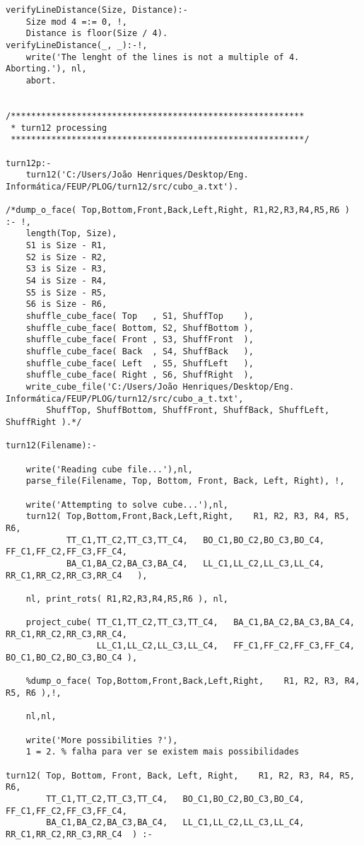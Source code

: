 \begin{lstlisting}
verifyLineDistance(Size, Distance):-
	Size mod 4 =:= 0, !,
	Distance is floor(Size / 4).
verifyLineDistance(_, _):-!,
	write('The lenght of the lines is not a multiple of 4. Aborting.'), nl,
	abort.

	
/**********************************************************
 * turn12 processing
 **********************************************************/
 
turn12p:-
	turn12('C:/Users/João Henriques/Desktop/Eng. Informática/FEUP/PLOG/turn12/src/cubo_a.txt').
 
/*dump_o_face( Top,Bottom,Front,Back,Left,Right, R1,R2,R3,R4,R5,R6 ) :- !,
	length(Top, Size),
	S1 is Size - R1,
	S2 is Size - R2,
	S3 is Size - R3,
	S4 is Size - R4,
	S5 is Size - R5,
	S6 is Size - R6,
	shuffle_cube_face( Top   , S1, ShuffTop    ),
	shuffle_cube_face( Bottom, S2, ShuffBottom ),
	shuffle_cube_face( Front , S3, ShuffFront  ),
	shuffle_cube_face( Back  , S4, ShuffBack   ),
	shuffle_cube_face( Left  , S5, ShuffLeft   ),
	shuffle_cube_face( Right , S6, ShuffRight  ),
	write_cube_file('C:/Users/João Henriques/Desktop/Eng. Informática/FEUP/PLOG/turn12/src/cubo_a_t.txt',
		ShuffTop, ShuffBottom, ShuffFront, ShuffBack, ShuffLeft, ShuffRight ).*/

turn12(Filename):-

	write('Reading cube file...'),nl,
	parse_file(Filename, Top, Bottom, Front, Back, Left, Right), !,
	
	write('Attempting to solve cube...'),nl,
	turn12( Top,Bottom,Front,Back,Left,Right,    R1, R2, R3, R4, R5, R6,
			TT_C1,TT_C2,TT_C3,TT_C4,   BO_C1,BO_C2,BO_C3,BO_C4,    FF_C1,FF_C2,FF_C3,FF_C4,
			BA_C1,BA_C2,BA_C3,BA_C4,   LL_C1,LL_C2,LL_C3,LL_C4,    RR_C1,RR_C2,RR_C3,RR_C4   ),

	nl,	print_rots( R1,R2,R3,R4,R5,R6 ), nl,
	
	project_cube( TT_C1,TT_C2,TT_C3,TT_C4,   BA_C1,BA_C2,BA_C3,BA_C4,   RR_C1,RR_C2,RR_C3,RR_C4,
                  LL_C1,LL_C2,LL_C3,LL_C4,   FF_C1,FF_C2,FF_C3,FF_C4,   BO_C1,BO_C2,BO_C3,BO_C4 ),
				  
	%dump_o_face( Top,Bottom,Front,Back,Left,Right,    R1, R2, R3, R4, R5, R6 ),!,
	
	nl,nl,

	write('More possibilities ?'),
	1 = 2. % falha para ver se existem mais possibilidades

turn12( Top, Bottom, Front, Back, Left, Right,    R1, R2, R3, R4, R5, R6,
		TT_C1,TT_C2,TT_C3,TT_C4,   BO_C1,BO_C2,BO_C3,BO_C4,    FF_C1,FF_C2,FF_C3,FF_C4,
		BA_C1,BA_C2,BA_C3,BA_C4,   LL_C1,LL_C2,LL_C3,LL_C4,    RR_C1,RR_C2,RR_C3,RR_C4  ) :-
	

\end{lstlisting}
